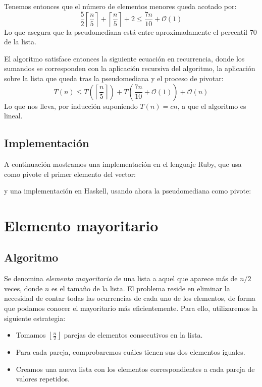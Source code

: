 \documentclass[a4paper, 11pt]{article} %
\begin{document}
      Tenemos entonces que el número de elementos menores queda acotado por:
      \begin{equation}
       \frac{5}{2} \left\lceil \frac{n}{5} \right\rceil + \left\lceil \frac{n}{5} \right\rceil + 2 \leq \frac{7n}{10} + \mathcal{O}(1) 
      \end{equation}
      Lo que asegura que la pseudomediana está entre aproximadamente el percentil $70$ de la lista.
      
      El algoritmo satisface entonces la siguiente ecuación en recurrencia, donde los sumandos se corresponden con la aplicación
      recursiva del algoritmo, la aplicación sobre la lista que queda tras la pseudomediana y el proceso de pivotar:
      \begin{equation}
       T(n) \leq T\left(\left\lceil \frac{n}{5} \right\rceil \right) + T\left(\frac{7n}{10} + \mathcal{O}(1) \right) + \mathcal{O}(n)
      \end{equation}
      Lo que nos lleva, por inducción suponiendo $T(n) = cn$, a que el algoritmo es lineal.
      
\subsection{Implementación}
A continuación mostramos una implementación en el lenguaje Ruby, que usa como pivote el primer elemento del vector:

\small
\texttt{}
\normalsize

y una implementación en Haskell, usando ahora la pseudomediana como pivote:

\small
\texttt{}
\normalsize


\section {Elemento mayoritario}
\subsection{Algoritmo}
Se denomina \textit{elemento mayoritario} de una lista a aquel que aparece más de $n/2$ veces, donde $n$ es el tamaño de la lista.
El problema reside en eliminar la necesidad de contar todas las ocurrencias de cada uno de los elementos, de forma que podamos conocer el mayoritario más eficientemente.
Para ello, utilizaremos la siguiente estrategia:

\begin{itemize}
\item Tomamos $\left\lfloor\frac{n}{2}\right\rfloor$ parejas de elementos consecutivos en la lista.
\item Para cada pareja, comprobaremos cuáles tienen sus dos elementos iguales.
\item Creamos una nueva lista con los elementos correspondientes a cada pareja de valores repetidos.
\end{itemize}
\end{document}
